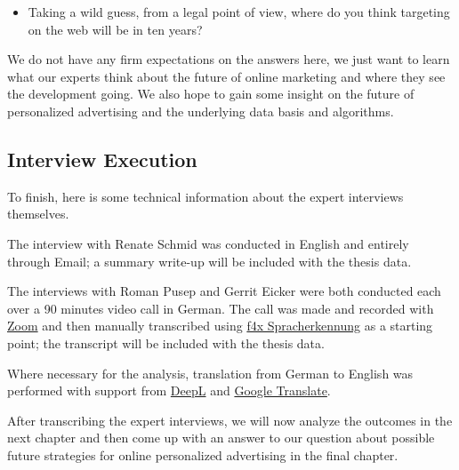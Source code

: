 \begin{itemize} 
 \item Taking a wild guess, from a legal point of view, where do you think targeting on the web will be in ten years?
\end{itemize}

We do not have any firm expectations on the answers here, we just want to learn what our experts think about the future of online marketing and where they see the development going. We also hope to gain some insight on the future of personalized advertising and the underlying data basis and algorithms.

\subsection{Interview Execution}

To finish, here is some technical information about the expert interviews themselves.

The interview with Renate Schmid was conducted in English and entirely through Email; a summary write-up will be included with the thesis data.

The interviews with Roman Pusep and Gerrit Eicker were both conducted each over a 90 minutes video call in German. The call was made and recorded with \href{https://zoom.us/}{Zoom} and then manually transcribed using \href{https://f4x.audiotranskription.de/}{f4x Spracherkennung} as a starting point; the transcript will be included with the thesis data.

Where necessary for the analysis, translation from German to English was performed with support from \href{https://www.deepl.com/en/translator}{DeepL} and \href{https://translate.google.de/}{Google Translate}.

After transcribing the expert interviews, we will now analyze the outcomes in the next chapter and then come up with an answer to our question about possible future strategies for online personalized advertising in the final chapter.
